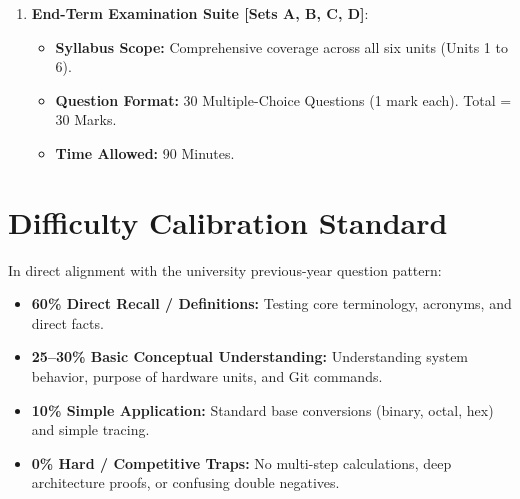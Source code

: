 \begin{enumerate}[leftmargin=8mm, label=\textbf{\Roman*.}]
    \item \textbf{End-Term Examination Suite [Sets A, B, C, D]}:
    \begin{itemize}[leftmargin=6mm]
        \item \textbf{Syllabus Scope:} Comprehensive coverage across all six units (Units 1 to 6).
        \item \textbf{Question Format:} 30 Multiple-Choice Questions (1 mark each). Total = 30 Marks.
        \item \textbf{Time Allowed:} 90 Minutes.
    \end{itemize}
\end{enumerate}

\section*{Difficulty Calibration Standard}
In direct alignment with the university previous-year question pattern:
\begin{itemize}[leftmargin=6mm]
    \item \textbf{60\% Direct Recall / Definitions:} Testing core terminology, acronyms, and direct facts.
    \item \textbf{25--30\% Basic Conceptual Understanding:} Understanding system behavior, purpose of hardware units, and Git commands.
    \item \textbf{10\% Simple Application:} Standard base conversions (binary, octal, hex) and simple tracing.
    \item \textbf{0\% Hard / Competitive Traps:} No multi-step calculations, deep architecture proofs, or confusing double negatives.
\end{itemize}

\newpage
